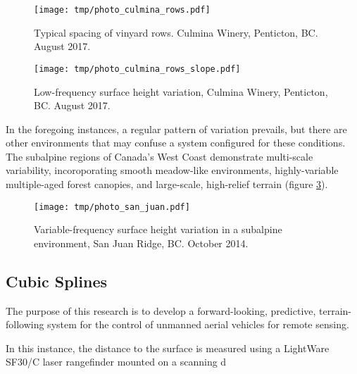 \documentclass[10pt]{article}
\begin{document}
\begin{figure} %
\texttt{[image: tmp/photo\_culmina\_rows.pdf]} 
\caption{Typical spacing of vinyard rows. Culmina Winery, Penticton, BC. August 2017.}
\label{fig:photo_culmina_rows}
\end{figure}

\begin{figure} %
\texttt{[image: tmp/photo\_culmina\_rows\_slope.pdf]} 
\caption{Low-frequency surface height variation, Culmina Winery, Penticton, BC. August 2017.}
\label{fig:photo_culmina_rows_slope}
\end{figure}

In the foregoing instances, a regular pattern of variation prevails, but there are other environments that may confuse a system configured for these conditions. The subalpine regions of Canada's West Coast demonstrate multi-scale variability, incoroporating smooth meadow-like environments, highly-variable multiple-aged forest canopies, and large-scale, high-relief terrain (figure \ref{fig:photo_san_juan}).

\begin{figure} %
\begin{center}
\texttt{[image: tmp/photo\_san\_juan.pdf]} 
\end{center}
\caption{Variable-frequency surface height variation in a subalpine environment, San Juan Ridge, BC. October 2014.}
\label{fig:photo_san_juan}
\end{figure}



\subsection{Cubic Splines}


The purpose of this research is to develop a forward-looking, predictive, terrain-following system for the control of unmanned aerial vehicles for remote sensing. 


In this instance, the distance to the surface is measured using a LightWare SF30/C laser rangefinder mounted on a scanning d





\newpage


\end{document}
